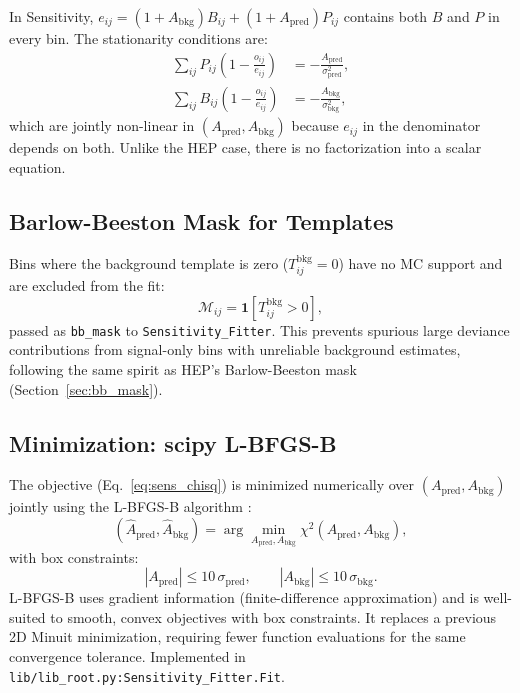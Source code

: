 \documentclass[12pt,a4paper]{article}
\newcommand{\Tbkg}{T^{\mathrm{bkg}}}
\newcommand{\Apred}{A_{\mathrm{pred}}}
\newcommand{\Abkg}{A_{\mathrm{bkg}}}
\newcommand{\spred}{\sigma_{\mathrm{pred}}}
\newcommand{\sbkg}{\sigma_{\mathrm{bkg}}}
\begin{document}
In Sensitivity, $e_{ij} = (1+\Abkg)B_{ij} + (1+\Apred)P_{ij}$ contains both
$B$ and $P$ in every bin.  The stationarity conditions are:
\begin{align}
  \sum_{ij} P_{ij}\!\left(1-\frac{o_{ij}}{e_{ij}}\right)
    &= -\frac{\Apred}{\spred^2},
  \label{eq:sens_stat_pred}\\
  \sum_{ij} B_{ij}\!\left(1-\frac{o_{ij}}{e_{ij}}\right)
    &= -\frac{\Abkg}{\sbkg^2},
  \label{eq:sens_stat_bkg}
\end{align}
which are jointly non-linear in $(\Apred,\Abkg)$ because $e_{ij}$ in the
denominator depends on both.  Unlike the HEP case, there is no factorization
into a scalar equation.

\subsection{Barlow-Beeston Mask for Templates}
\label{sec:sens_bb}

Bins where the background template is zero ($\Tbkg_{ij}=0$) have no MC
support and are excluded from the fit:
\begin{equation}
  \mathcal{M}_{ij} = \mathbf{1}\!\left[\Tbkg_{ij} > 0\right],
  \label{eq:sens_bb_mask}
\end{equation}
passed as \texttt{bb\_mask} to \texttt{Sensitivity\_Fitter}.
This prevents spurious large deviance contributions from signal-only bins
with unreliable background estimates, following the same spirit as
HEP's Barlow-Beeston mask (Section~\ref{sec:bb_mask}).

\subsection{Minimization: scipy L-BFGS-B}
\label{sec:sens_minimization}

The objective (Eq.~\eqref{eq:sens_chisq}) is minimized numerically over
$(\Apred,\Abkg)$ jointly using the L-BFGS-B algorithm
\cite{ByrdEtAl1995,ZhuEtAl1997}:
\begin{equation}
  (\hat{A}_{\mathrm{pred}},\hat{A}_{\mathrm{bkg}})
  = \arg\min_{\Apred,\Abkg}\chi^2(\Apred,\Abkg),
  \label{eq:sens_minimize}
\end{equation}
with box constraints:
\begin{equation}
  |\Apred| \le 10\,\spred,
  \qquad
  |\Abkg| \le 10\,\sbkg.
  \label{eq:sens_bounds}
\end{equation}
L-BFGS-B uses gradient information (finite-difference approximation)
and is well-suited to smooth, convex objectives with box constraints.
It replaces a previous 2D Minuit minimization, requiring fewer function
evaluations for the same convergence tolerance.
Implemented in \texttt{lib/lib\_root.py:Sensitivity\_Fitter.Fit}.
\end{document}
